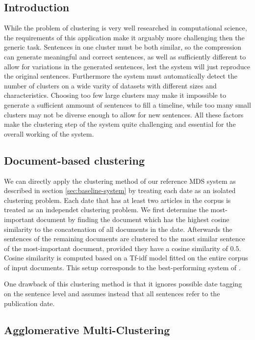 \documentclass[a4paper,BCOR=10mm]{report}
\begin{document}
\subsection{Introduction}

While the problem of clustering is very well researched in computational science, the requirements of this application make it arguably more challenging then the generic task. Sentences in one cluster must be both similar, so the compression can generate meaningful and correct sentences, as well as sufficiently different to allow for variations in the generated sentences, lest the system will just reproduce the original sentences.
Furthermore the system must automatically detect the number of clusters on a wide varity of datasets with different sizes and characteristics.
Choosing too few large clusters may make it impossible to generate a sufficient ammount of sentences to fill a timeline, while too many small clusters may not be diverse enough to allow for new sentences.
All these factors make the clustering step of the system quite challenging and essential for the overall working of the system.


\subsection{Document-based clustering}

We can directly apply the clustering method of our reference MDS system as described in section \ref{sec:baseline-system} by treating each date as an isolated clustering problem.
Each date that has at least two articles in the corpus is treated as an independet clustering problem.
We first determine the most-important document by finding the document which has the highest cosine similarity to the concatenation of all documents in the date.
Afterwards the sentences of the remaining documents are clustered to the most similar sentence of the most-important document, provided they have a cosine similarity of $0.5$. Cosine similarity is computed based on a Tf-idf model fitted on the entire corpus of input documents.
This setup corresponds to the best-performing system of \citet{banerjee}.

One drawback of this clustering method is that it ignores possible date tagging on the sentence level and assumes instead that all sentences refer to the publication date. 

\subsection{Agglomerative Multi-Clustering}
\end{document}

